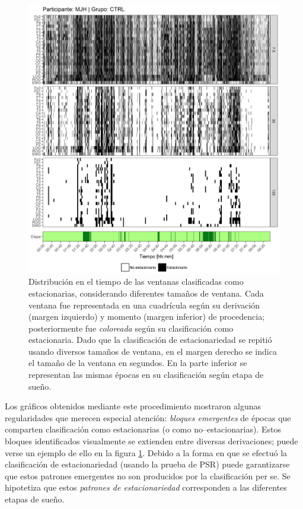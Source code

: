 \documentclass[12pt,letterpaper]{book}
\begin{document}
\begin{figure}
\centering
\includegraphics[width=\linewidth]
{./scripts_graf_res/MJNNVIGILOS_patrones_show.png}
\caption[Distribución en el tiempo de las ventanas clasificadas como estacionarias, considerando diferentes tamaños de ventana]{Distribución en el tiempo de las ventanas clasificadas como estacionarias, considerando diferentes tamaños de ventana. 
Cada ventana fue representada en una cuadrícula según su derivación (margen izquierdo) y momento (margen inferior) de procedencia; posteriormente fue \textit{coloreada} según su clasificación como estacionaria.
Dado que la clasificación de estacionariedad se repitió usando diversos tamaños de ventana, en el margen derecho se indica el tamaño de la ventana en segundos.
En la parte inferior se representan las mismas épocas en su clasificación según etapa de sueño.
}
\label{img:patrones}
\end{figure}

Los gráficos obtenidos mediante este procedimiento mostraron algunas regularidades que merecen especial atención: \textit{bloques emergentes} de épocas que comparten clasificación como estacionarias (o como no--estacionarias).
%
Estos bloques identificados visualmente se extienden entre diversas derivaciones; puede verse un ejemplo de ello en la figura \ref{img:patrones}.
%
Debido a la forma en que se efectuó la clasificación de estacionariedad (usando la prueba de PSR) puede garantizarse que estos patrones emergentes no son producidos por la clasificación per se.
%
Se hipotetiza que estos \textit{patrones de estacionariedad}
corresponden a las diferentes etapas de sueño.
%
\end{document}
